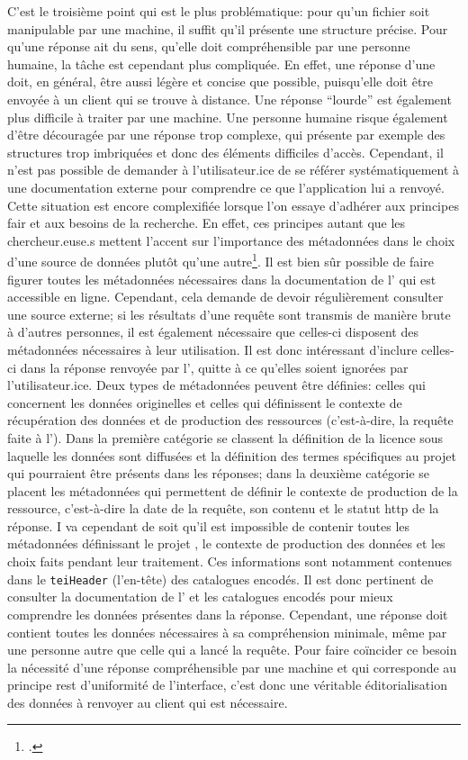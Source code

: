 C'est le troisième point qui est le plus problématique: pour qu'un fichier soit manipulable par une machine, il suffit qu'il présente une structure précise. Pour qu'une réponse ait du sens, qu'elle doit compréhensible par une personne humaine, la tâche est cependant plus compliquée. En effet, une réponse d'une \api{} doit, en général, être aussi légère et concise que possible, puisqu'elle doit être envoyée à un client qui se trouve à distance. Une réponse \enquote{lourde} est également plus difficile à traiter par une machine. Une personne humaine risque également d'être découragée par une réponse trop complexe, qui présente par exemple des structures trop imbriquées et donc des éléments difficiles d'accès. Cependant, il n'est pas possible de demander à l'utilisateur.ice de se référer systématiquement à une documentation externe pour comprendre ce que l'application lui a renvoyé. Cette situation est encore complexifiée lorsque l'on essaye d'adhérer aux principes \gls{fair} et aux besoins de la recherche. En effet, ces principes autant que les chercheur.euse.s mettent l'accent sur l'importance des métadonnées dans le choix d'une source de données plutôt qu'une autre\footcite[p. 290-291 et p. 932-933 respectivement]{edmond_apis_2015, boeckhout_fair_2018}. Il est bien sûr possible de faire figurer toutes les métadonnées nécessaires dans la documentation de l'\api{} qui est accessible en ligne. Cependant, cela demande de devoir régulièrement consulter une source externe; si les résultats d'une requête sont transmis de manière brute à d'autres personnes, il est également nécessaire que celles-ci disposent des métadonnées nécessaires à leur utilisation. Il est donc intéressant d'inclure celles-ci dans la réponse renvoyée par l'\api{}, quitte à ce qu'elles soient ignorées par l'utilisateur.ice. Deux types de métadonnées peuvent être définies: celles qui concernent les données originelles et celles qui définissent le contexte de récupération des données et de production des ressources (c'est-à-dire, la requête faite à l'\api{}). Dans la première catégorie se classent la définition de la licence sous laquelle les données sont diffusées et la définition des termes spécifiques au projet qui pourraient être présents dans les réponses; dans la deuxième catégorie se placent les métadonnées qui permettent de définir le contexte de production de la ressource, c'est-à-dire la date de la requête, son contenu et le statut \gls{http} de la réponse. I va cependant de soit qu'il est impossible de contenir toutes les métadonnées définissant le projet \ktb{}, le contexte de production des données et les choix faits pendant leur traitement. Ces informations sont notamment contenues dans le \texttt{teiHeader} (l'en-tête) des catalogues encodés. Il est donc pertinent de consulter la documentation de l'\api{} et les catalogues encodés pour mieux comprendre les données présentes dans la réponse. Cependant, une réponse doit contient toutes les données nécessaires à sa compréhension minimale, même par une personne autre que celle qui a lancé la requête. Pour faire coïncider ce besoin la nécessité d'une réponse compréhensible par une machine et qui corresponde au principe \gls{rest} d'uniformité de l'interface, c'est donc une véritable éditorialisation des données à renvoyer au client qui est nécessaire.


